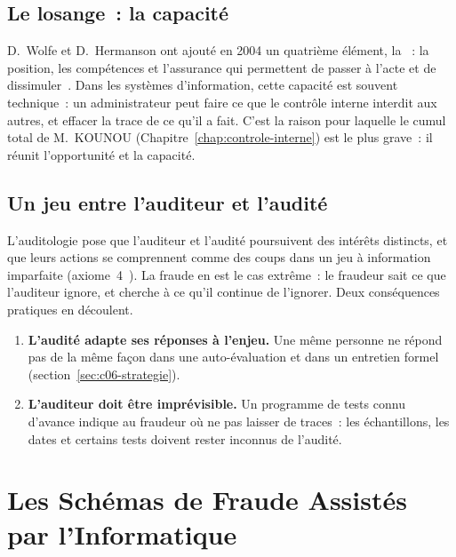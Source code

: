 \subsection{Le losange~: la capacité}

D.~Wolfe et D.~Hermanson ont ajouté en 2004 un quatrième élément, la
~: la position, les
compétences et l'assurance qui permettent de passer à l'acte et de
dissimuler~\cite{wolfe2004diamond}. Dans les systèmes d'information, cette
capacité est souvent technique~: un administrateur peut faire ce que le
contrôle interne interdit aux autres, et effacer la trace de ce qu'il a
fait. C'est la raison pour laquelle le cumul total de M.~KOUNOU
(Chapitre~\ref{chap:controle-interne}) est le plus grave~: il réunit
l'opportunité et la capacité.

\subsection{Un jeu entre l'auditeur et l'audité}

L'auditologie pose que l'auditeur et l'audité poursuivent des intérêts
distincts, et que leurs actions se comprennent comme des coups dans un jeu
à information imparfaite (axiome~4~\cite{minka2026auditologie}). La fraude en
est le cas extrême~: le fraudeur sait ce que l'auditeur ignore, et cherche à
ce qu'il continue de l'ignorer. Deux conséquences pratiques en découlent.
\begin{enumerate}
    \item \textbf{L'audité adapte ses réponses à l'enjeu.} Une même personne
          ne répond pas de la même façon dans une auto-évaluation et dans un
          entretien formel (section~\ref{sec:c06-strategie}).
    \item \textbf{L'auditeur doit être imprévisible.} Un programme de tests
          connu d'avance indique au fraudeur où ne pas laisser de traces~:
          les échantillons, les dates et certains tests doivent rester
          inconnus de l'audité.
\end{enumerate}

\section{Les Schémas de Fraude Assistés par l'Informatique}
\label{sec:c06-schemas}

